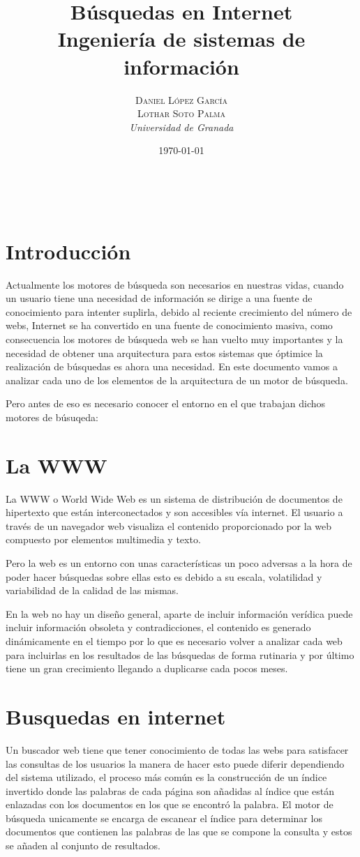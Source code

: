 \documentclass[a4paper, 11pt]{article} %
\title{\textbf{Búsquedas en Internet}\\ %
\vspace{20 pt}
Ingeniería de sistemas de información} %
\author{\textsc{Daniel López García\\
Lothar Soto Palma} %
\\{\textit{Universidad de Granada}}} %
\date{\today} %
\makeatletter
\renewcommand{\maketitle}{ %
\begin{center} %
{\Huge\@title} %
\end{center}

\vspace{20pt} %

\begin{flushright} %
{\large\@author} %
\\\@date %

\vspace{40pt} %
\end{flushright}
\renewcommand{\baselinestretch}{0.5}

}
\makeatother
\begin{document}
	\maketitle
	\tableofcontents
	\listoffigures
	\newpage

	\section{Introducción}
	Actualmente los motores de búsqueda son necesarios en nuestras vidas, cuando un usuario tiene una necesidad de información se dirige a una fuente de conocimiento para intenter suplirla, debido al reciente crecimiento del número de webs, Internet se ha convertido en una fuente de conocimiento masiva, como consecuencia los motores de búsqueda web se han vuelto muy importantes y la necesidad de obtener una arquitectura para estos sistemas que óptimice la realización de búsquedas es ahora una necesidad. En este documento vamos a analizar cada uno de los elementos de la arquitectura de un motor de búsqueda.

	Pero antes de eso es necesario conocer el entorno en el que trabajan dichos motores de búsuqeda:
	\section{La WWW}
	La WWW o World Wide Web es un sistema de distribución de documentos de hipertexto que están interconectados y son accesibles vía internet. El usuario a través de un navegador web visualiza el contenido proporcionado por la web compuesto por elementos multimedia y texto.

	Pero la web es un entorno con unas características un poco adversas a la hora de poder hacer búsquedas sobre ellas esto es debido a su escala, volatilidad y variabilidad de la calidad de las mismas.

	En la web no hay un diseño general, aparte de incluir información verídica puede incluir información obsoleta y contradicciones, el contenido es generado dinámicamente en el tiempo por lo que es necesario volver a analizar cada web para incluirlas en los resultados de las búsquedas de forma rutinaria y por último tiene un gran crecimiento llegando a duplicarse cada pocos meses.

	\section{Busquedas en internet}
	Un buscador web tiene que tener conocimiento de todas las webs para satisfacer las consultas de los usuarios la manera de hacer esto puede diferir dependiendo del sistema utilizado, el proceso más común es la construcción de un índice invertido donde las palabras de cada página son añadidas al índice que están enlazadas con los documentos en los que se encontró la palabra. El motor de búsqueda unicamente se encarga de escanear el índice para determinar los documentos que contienen las palabras de las que se compone la consulta y estos se añaden al conjunto de resultados.
\end{document}
